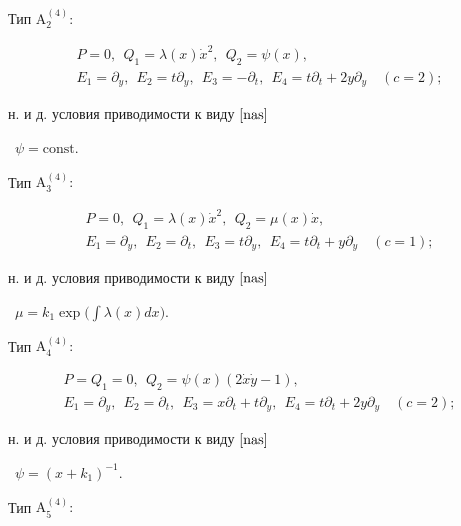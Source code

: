 \begin{thms}
Тип $\mathrm{A^{(4)}_2}{:}$


\begin{gather*}


P=0,\ \ Q_1=\lambda(x)\Dot x^2, \ \ Q_2= \psi(x), \\


E_1=\partial_y,\ \ E_2=t\partial_ y,\ \ E_3=-\partial_ t,


\ \ E_4=t\partial_t+2y\partial_y\quad (c=2);


\end{gather*}


н. и д. условия приводимости к виду $\eqref{nas}$


\ $\psi=\mathrm{const}$.





Тип $\mathrm{A^{(4)}_3}{:}$


\begin{gather*}


P=0,\ \ Q_1=\lambda(x)\Dot x^2,\ \ Q_2= \mu(x)\Dot x,\\


E_1=\partial_y,\ \ E_2=\partial_ t,\ \ E_3=t\partial_ y,


\ \ E_4=t\partial_t+y\partial_y\quad (c=1);


\end{gather*}


н. и д. условия приводимости к виду $\eqref{nas}$


\ $\displaystyle \mu=k_1\exp\Big(\int\lambda(x) dx\Big)$.





Тип $\mathrm{A^{(4)}_4}{:}$


\begin{gather*}


P=Q_1=0,\ \ Q_2= \psi(x)(2\Dot x\Dot y-1), \\


E_1=\partial_y,\ \ E_2=\partial_ t,


\ \ E_3=x\partial_ t+t\partial_ y,


\ \ E_4=t\partial_t+2y\partial_y\quad (c=2);


\end{gather*}


н. и д. условия приводимости к виду $\eqref{nas}$


\ $\psi=(x+k_1)^{-1}$.





Тип $\mathrm{A^{(4)}_5}{:}$



\end{thms}
